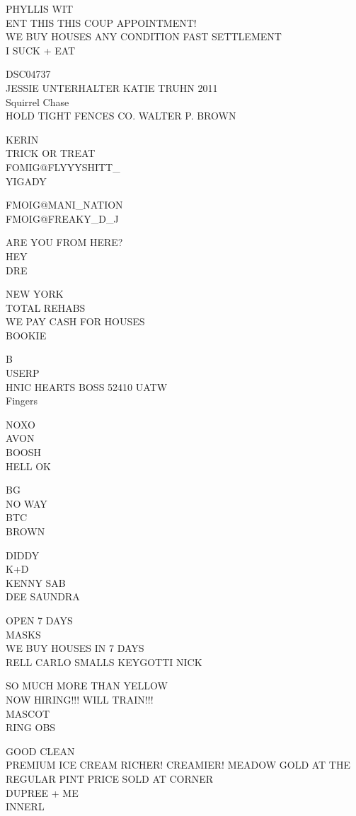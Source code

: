 \documentclass[10pt,letterpaper]{article}
\begin{document}
PHYLLIS WIT\\
ENT THIS THIS COUP APPOINTMENT!\\
WE BUY HOUSES ANY CONDITION FAST SETTLEMENT\\
I SUCK + EAT

DSC04737\\
JESSIE UNTERHALTER KATIE TRUHN 2011\\
Squirrel Chase\\
HOLD TIGHT FENCES CO. WALTER P. BROWN

KERIN\\
TRICK OR TREAT\\
FOMIG@FLYYYSHITT\_\\
YIGADY

FMOIG@MANI\_NATION\\
FMOIG@FREAKY\_D\_J

ARE YOU FROM HERE?\\
HEY\\
DRE

NEW YORK\\
TOTAL REHABS\\
WE PAY CASH FOR HOUSES\\
BOOKIE

B\\
USERP\\
HNIC HEARTS BOSS 52410 UATW\\
Fingers

NOXO\\
AVON\\
BOOSH\\
HELL OK

BG\\
NO WAY\\
BTC\\
BROWN

DIDDY\\
K+D\\
KENNY SAB\\
DEE SAUNDRA

OPEN 7 DAYS\\
MASKS\\
WE BUY HOUSES IN 7 DAYS\\
RELL CARLO SMALLS KEYGOTTI NICK

SO MUCH MORE THAN YELLOW\\
NOW HIRING!!! WILL TRAIN!!!\\
MASCOT\\
RING OBS

GOOD CLEAN\\
PREMIUM ICE CREAM RICHER! CREAMIER! MEADOW GOLD AT THE REGULAR PINT PRICE SOLD AT CORNER\\
DUPREE + ME\\
INNERL
\end{document}
